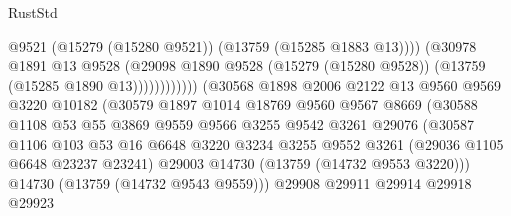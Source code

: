 \begin{lexlean}{RustStd}
\begin{coremodule}
                                              @9521
                                              (@15279 (@15280 @9521))
                                              (@13759 (@15285 @1883 @13))))
                                          (@30978
                                            @1891
                                            @13
                                            @9528
                                            (@29098
                                              @1890
                                              @9528
                                              (@15279 (@15280 @9528))
                                              (@13759 (@15285 @1890 @13))))))))))))
                          (@30568
                            @1898
                            @2006
                            @2122
                            @13
                            @9560
                            @9569
                            @3220
                            @10182
                            (@30579
                              @1897
                              @1014
                              @18769
                              @9560
                              @9567
                              @8669
                              (@30588
                                @1108
                                @53
                                @55
                                @3869
                                @9559
                                @9566
                                @3255
                                @9542
                                @3261
                                @29076
                                (@30587
                                  @1106
                                  @103
                                  @53
                                  @16
                                  @6648
                                  @3220
                                  @3234
                                  @3255
                                  @9552
                                  @3261
                                  (@29036 @1105 @6648 @23237 @23241)
                                  @29003
                                  @14730
                                  (@13759 (@14732 @9553 @3220)))
                                @14730
                                (@13759 (@14732 @9543 @9559)))
                              @29908
                              @29911
                              @29914
                              @29918
                              @29923

\end{coremodule}
\end{lexlean}
